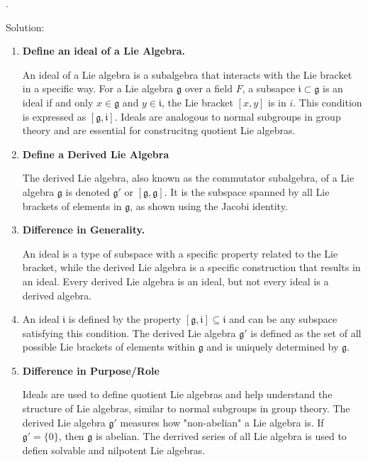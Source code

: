 \documentclass[12pt,a4paper]{report}
\begin{document}
\begin{remark}.

\noindent
Solution:
\begin{enumerate}[label=Step \arabic*:]
	\item \textbf{Define an ideal of a Lie Algebra.}
	
	An ideal of a Lie algebra is a subalgebra that interacts with the Lie bracket in a specific way.  For a Lie algebra $\mathfrak{g}$ over a field $F$, a subsapce $\mathfrak{i} \subset \mathfrak{g}$ is an ideal if and only $x \in \mathfrak{g}$ and $y \in \mathfrak{i}$, the Lie bracket $[x,y]$ is in $i$.  This condition is expressed as $[\mathfrak{g}, \mathfrak{i}]$.  Ideals are analogous to normal subgroups in group theory and are essential for construcitng quotient Lie algebras.
	
	\item \textbf{Define a Derived Lie Algebra}
	
	The derived Lie algebra, also known as the commutator subalgebra, of a Lie algebra $\mathfrak{g}$ is denoted $\mathfrak{g}'$ or $[\mathfrak{g}, \mathfrak{g}]$.  It is the subspace spanned by all Lie brackets of elements in $\mathfrak{g}$, as shown using the Jacobi identity.
	
	\item \textbf{Difference in Generality.}
	
	An ideal is a type of subspace with a specific property related to the Lie bracket, while the derived Lie algebra is a specific construction that results in an ideal.  Every derived Lie algebra is an ideal, but not every ideal is a derived algebra.
	
	\item An ideal $\mathfrak{i}$ is defined by the property $[\mathfrak{g},\mathfrak{i}] \subseteq \mathfrak{i}$ and can be any subspace satisfying this condition.  The derived Lie algebra $\mathfrak{g}'$ is defined as the set of all possible Lie brackets of elements within $\mathfrak{g}$ and is uniquely determined by $\mathfrak{g}$.
	
	\item \textbf{Difference in Purpose/Role}
	
	Ideals are used to define quotient Lie algebras and help understand the structure of Lie algebras,  similar to normal subgroups in group theory.  The derived Lie algebra $\mathfrak{g}'$ measures how "non-abelian" a Lie algebra is.  If $\mathfrak{g}'=\{0\}$, then $\mathfrak{g}$ is abelian.  The derrived series of all Lie algebra is used to defien solvable and nilpotent Lie algebras.
	

\end{enumerate}
\end{remark}
\end{document}

